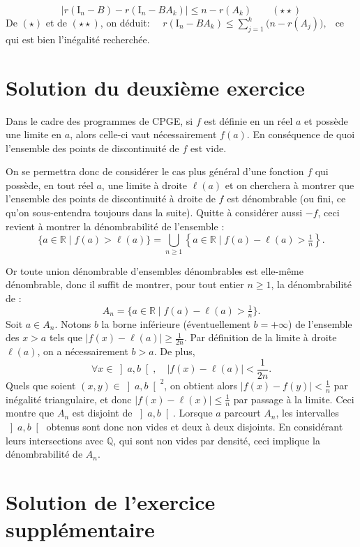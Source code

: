 $$\left|r(\mathrm I_n -B) - r( \mathrm I_n -BA_k) \right | \leqslant n- r(A_k)\qquad (\star \star)$$ 
De $(\star)$ et de $(\star\star)$, on déduit: $ \quad r(\mathrm I_n -BA_k) \leqslant \displaystyle \sum_{j=1} ^k \big(n- r(A_j)\big),\:\:$ ce qui est bien l'inégalité recherchée.

\section{Solution du deuxième exercice} %

Dans le cadre des programmes de CPGE, si $f$ est définie en un réel $a$ et possède une limite en $a$, alors celle-ci vaut nécessairement $f(a)$. En conséquence de quoi l'ensemble des points de discontinuité de $f$ est vide.

On se permettra donc de considérer le cas plus général d'une fonction $f$ qui possède, en tout réel $a$, une limite à droite $\ell(a)$ et on cherchera à montrer que l'ensemble des points de discontinuité à droite de $f$ est dénombrable (ou fini, ce qu'on sous-entendra toujours dans la suite). Quitte à considérer aussi $-f$, ceci revient à montrer la dénombrabilité de l'ensemble :
\[
\{a \in \mathbb R \mid f(a) > \ell(a)\} = \bigcup_{n\geqslant 1} \left\{a \in \mathbb R \mid f(a) - \ell(a) > \tfrac1n\right\}.
\]

Or toute union dénombrable d'ensembles dénombrables est elle-même dénombrable, donc il suffit de montrer, pour tout entier $n \geqslant 1$, la dénombrabilité de :
\[
A_n = \{a \in \mathbb R \mid f(a) - \ell(a) > \tfrac1n\}.
\]
Soit $a \in A_n$. Notons $b$ la borne inférieure (éventuellement $b = +\infty$) de l'ensemble des $x > a$ tels que $|f(x) - \ell(a)| \geqslant \frac1{2n}$. Par définition de la limite à droite $\ell(a)$, on a nécessairement $b > a$. De plus,
\[
\forall x \in \left]a,b\right[,\quad |f(x) - \ell(a)| < \frac1{2n}.
\]
Quels que soient $(x,y) \in \left]a,b\right[^2$, on obtient alors $|f(x)-f(y)| < \frac1n$ par inégalité triangulaire, et donc $|f(x) - \ell(x)| \leqslant \frac1n$ par passage à la limite. Ceci montre que $A_n$ est disjoint de $\left]a,b\right[$.
Lorsque $a$ parcourt $A_n$, les intervalles $\left]a,b\right[$ obtenus sont donc non vides et deux à deux disjoints. En considérant leurs intersections avec $\mathbb Q$, qui sont non vides par densité, ceci implique la dénombrabilité de $A_n$.

\section{Solution de l'exercice supplémentaire} %

